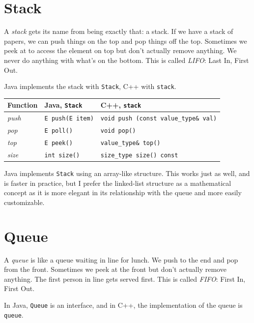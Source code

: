 \section{Stack}

A \textit{stack} gets its name from being exactly that: a stack. If we have a stack of papers, we can push things on the top and pop things off the top. Sometimes we peek at to access the element on top but don't actually remove anything. We never do anything with what's on the bottom. This is called \textit{LIFO}: Last In, First Out.

Java implements the stack with \texttt{Stack}, C++ with \texttt{stack}.

\begin{center}
    \begin{tabular}{ | p{5cm} | p{5cm} | p{5cm} | }
      \hline
      \textbf{Function}	&	\textbf{Java, \texttt{Stack}}	&	\textbf{C++, \texttt{stack}} \\ \hline
      \textit{push}		&	\texttt{E push(E item)}	&	\texttt{void push (const value\_type\& val)} \\ \hline
      \textit{pop}			&	\texttt{E poll()}		&	\texttt{void pop()}	\\ \hline
      \textit{top}		&	\texttt{E peek()}		&	\texttt{value\_type\& top()}	\\ \hline
      \textit{size} & \texttt{int size()} & \texttt{size\_type size() const} \\ \hline
    \end{tabular}
\end{center}

Java implements \texttt{Stack} using an array-like structure. This works just as well, and is faster in practice, but I prefer the linked-list structure as a mathematical concept as it is more elegant in its relationship with the queue and more easily customizable.

\section{Queue}

A \textit{queue} is like a queue waiting in line for lunch. We push to the end and pop from the front. Sometimes we peek at the front but don't actually remove anything. The first person in line gets served first. This is called \textit{FIFO}: First In, First Out.

In Java, \texttt{Queue} is an interface, and in C++, the implementation of the queue is \texttt{queue}.


